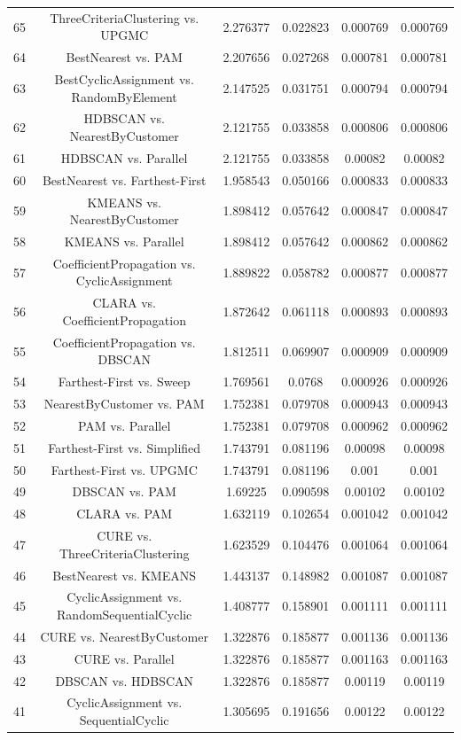 \documentclass[a4paper,10pt]{article}
\begin{document}
\begin{landscape}
\begin{table}[!htp]
\begin{tabular}{cccccc}
65&ThreeCriteriaClustering vs. UPGMC&2.276377&0.022823&0.000769&0.000769\\
64&BestNearest vs. PAM&2.207656&0.027268&0.000781&0.000781\\
63&BestCyclicAssignment vs. RandomByElement&2.147525&0.031751&0.000794&0.000794\\
62&HDBSCAN vs. NearestByCustomer&2.121755&0.033858&0.000806&0.000806\\
61&HDBSCAN vs. Parallel&2.121755&0.033858&0.00082&0.00082\\
60&BestNearest vs. Farthest-First&1.958543&0.050166&0.000833&0.000833\\
59&KMEANS vs. NearestByCustomer&1.898412&0.057642&0.000847&0.000847\\
58&KMEANS vs. Parallel&1.898412&0.057642&0.000862&0.000862\\
57&CoefficientPropagation vs. CyclicAssignment&1.889822&0.058782&0.000877&0.000877\\
56&CLARA vs. CoefficientPropagation&1.872642&0.061118&0.000893&0.000893\\
55&CoefficientPropagation vs. DBSCAN&1.812511&0.069907&0.000909&0.000909\\
54&Farthest-First vs. Sweep&1.769561&0.0768&0.000926&0.000926\\
53&NearestByCustomer vs. PAM&1.752381&0.079708&0.000943&0.000943\\
52&PAM vs. Parallel&1.752381&0.079708&0.000962&0.000962\\
51&Farthest-First vs. Simplified&1.743791&0.081196&0.00098&0.00098\\
50&Farthest-First vs. UPGMC&1.743791&0.081196&0.001&0.001\\
49&DBSCAN vs. PAM&1.69225&0.090598&0.00102&0.00102\\
48&CLARA vs. PAM&1.632119&0.102654&0.001042&0.001042\\
47&CURE vs. ThreeCriteriaClustering&1.623529&0.104476&0.001064&0.001064\\
46&BestNearest vs. KMEANS&1.443137&0.148982&0.001087&0.001087\\
45&CyclicAssignment vs. RandomSequentialCyclic&1.408777&0.158901&0.001111&0.001111\\
44&CURE vs. NearestByCustomer&1.322876&0.185877&0.001136&0.001136\\
43&CURE vs. Parallel&1.322876&0.185877&0.001163&0.001163\\
42&DBSCAN vs. HDBSCAN&1.322876&0.185877&0.00119&0.00119\\
41&CyclicAssignment vs. SequentialCyclic&1.305695&0.191656&0.00122&0.00122\\

\end{tabular}
\end{table}
\end{landscape}
\end{document}

